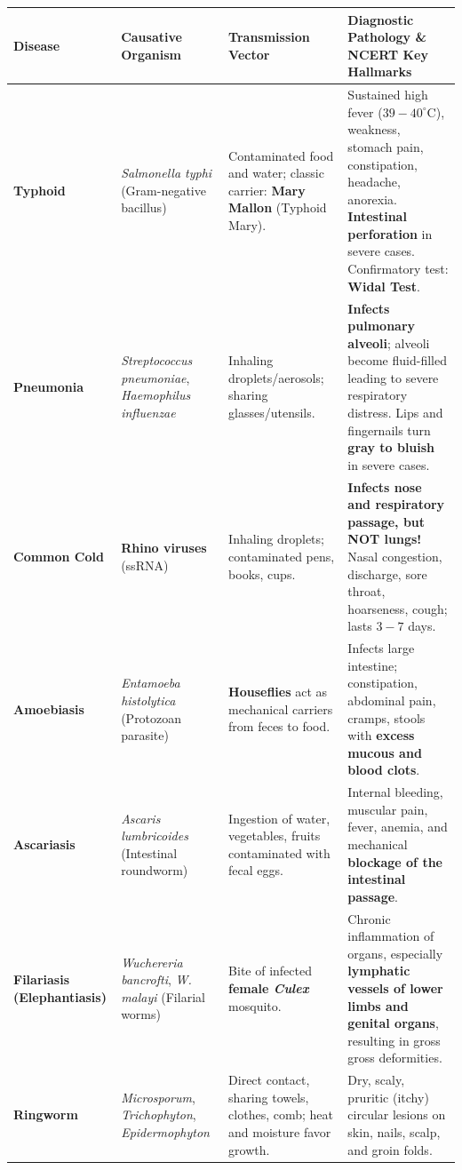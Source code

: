 \documentclass[10pt,a4paper]{article}
\begin{document}
\begin{conceptbox}
\begin{center}
\scriptsize
\begin{tabular}{|p{1.8cm}|p{2.4cm}|p{2.4cm}|p{7.6cm}|}
\hline
\textbf{Disease} & \textbf{Causative Organism} & \textbf{Transmission Vector} & \textbf{Diagnostic Pathology \& NCERT Key Hallmarks} \\
\hline
\textbf{Typhoid} & \textit{Salmonella typhi} (Gram-negative bacillus) & Contaminated food and water; classic carrier: \textbf{Mary Mallon} (Typhoid Mary). & Sustained high fever ($39-40^\circ\mathrm{C}$), weakness, stomach pain, constipation, headache, anorexia. \textbf{Intestinal perforation} in severe cases. Confirmatory test: \textbf{Widal Test}. \\
\hline
\textbf{Pneumonia} & \textit{Streptococcus pneumoniae}, \textit{Haemophilus influenzae} & Inhaling droplets/aerosols; sharing glasses/utensils. & \textbf{Infects pulmonary alveoli}; alveoli become fluid-filled leading to severe respiratory distress. Lips and fingernails turn \textbf{gray to bluish} in severe cases. \\
\hline
\textbf{Common Cold} & \textbf{Rhino viruses} (ssRNA) & Inhaling droplets; contaminated pens, books, cups. & \textbf{Infects nose and respiratory passage, but NOT lungs!} Nasal congestion, discharge, sore throat, hoarseness, cough; lasts $3-7$ days. \\
\hline
\textbf{Amoebiasis} & \textit{Entamoeba histolytica} (Protozoan parasite) & \textbf{Houseflies} act as mechanical carriers from feces to food. & Infects large intestine; constipation, abdominal pain, cramps, stools with \textbf{excess mucous and blood clots}. \\
\hline
\textbf{Ascariasis} & \textit{Ascaris lumbricoides} (Intestinal roundworm) & Ingestion of water, vegetables, fruits contaminated with fecal eggs. & Internal bleeding, muscular pain, fever, anemia, and mechanical \textbf{blockage of the intestinal passage}. \\
\hline
\textbf{Filariasis (Elephantiasis)} & \textit{Wuchereria bancrofti}, \textit{W. malayi} (Filarial worms) & Bite of infected \textbf{female \textit{Culex}} mosquito. & Chronic inflammation of organs, especially \textbf{lymphatic vessels of lower limbs and genital organs}, resulting in gross gross deformities. \\
\hline
\textbf{Ringworm} & \textit{Microsporum}, \textit{Trichophyton}, \textit{Epidermophyton} & Direct contact, sharing towels, clothes, comb; heat and moisture favor growth. & Dry, scaly, pruritic (itchy) circular lesions on skin, nails, scalp, and groin folds. \\
\hline
\end{tabular}
\end{center}
\end{conceptbox}
\end{document}
